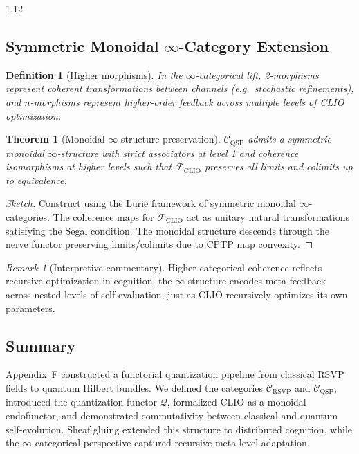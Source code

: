 \documentclass[12pt,a4paper]{article}
\numberwithin{equation}{section}
\newtheorem{definition}{Definition}[section]
\newtheorem{theorem}{Theorem}[section]
\theoremstyle{remark}
\newtheorem{remark}{Remark}[section]
\theoremstyle{definition}
\begin{document}
\begin{spacing}{1.12}
\subsection{Symmetric Monoidal $\infty$-Category Extension}\label{sec:F-infinity}

\begin{definition}[Higher morphisms]\label{def:F-higher}
In the $\infty$-categorical lift, 2-morphisms represent \emph{coherent transformations between channels} (e.g.\ stochastic refinements), and $n$-morphisms represent higher-order feedback across multiple levels of CLIO optimization.
\end{definition}

\begin{theorem}[Monoidal $\infty$-structure preservation]\label{thm:F-infinity}
$\mathcal{C}_{\mathrm{QSP}}$ admits a symmetric monoidal $\infty$-structure with strict associators at level 1 and coherence isomorphisms at higher levels such that $\mathcal{F}_{\mathrm{CLIO}}$ preserves all limits and colimits up to equivalence.
\end{theorem}

\begin{proof}[Sketch]
Construct using the Lurie framework of symmetric monoidal $\infty$-categories. The coherence maps for $\mathcal{F}_{\mathrm{CLIO}}$ act as unitary natural transformations satisfying the Segal condition. The monoidal structure descends through the nerve functor preserving limits/colimits due to CPTP map convexity.
\end{proof}

\begin{remark}[Interpretive commentary]
Higher categorical coherence reflects recursive optimization in cognition: the $\infty$-structure encodes meta-feedback across nested levels of self-evaluation, just as CLIO recursively optimizes its own parameters.
\end{remark}

\subsection{Summary}\label{sec:F-summary}
Appendix~F constructed a functorial quantization pipeline from classical RSVP fields to quantum Hilbert bundles.  
We defined the categories $\mathcal{C}_{\mathrm{RSVP}}$ and $\mathcal{C}_{\mathrm{QSP}}$, introduced the quantization functor $\mathcal{Q}$, formalized CLIO as a monoidal endofunctor, and demonstrated commutativity between classical and quantum self-evolution.  
Sheaf gluing extended this structure to distributed cognition, while the $\infty$-categorical perspective captured recursive meta-level adaptation.



\end{spacing}
\end{document}
